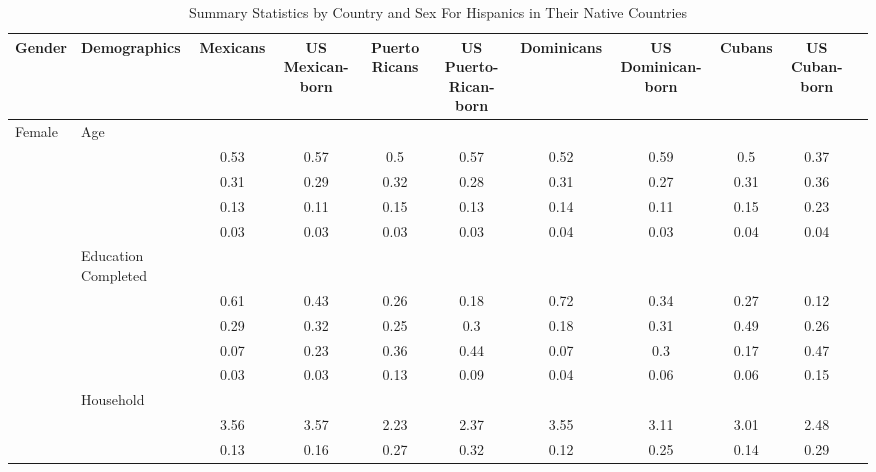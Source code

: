 \begin{table}[ht]
\centering
\caption{Summary Statistics by Country and Sex For Hispanics in Their Native Countries} 
\begingroup\small
\begin{tabular}{l>{\raggedright\arraybackslash}p{3.2cm}|ccccccccc}
  \hline
Gender & Demographics & Mexicans & US Mexican-born & Puerto Ricans & US Puerto-Rican-born & Dominicans & US Dominican-born & Cubans & US Cuban-born \\ 
  \hline
Female & Age &  &  &  &  &  &  &  &  \\ 
   & \multicolumn{1}{>{\raggedleft\arraybackslash}p{1.5cm}|}{\makebox[1.5cm][r]{60 - 69 }} & 0.53 & 0.57 & 0.5 & 0.57 & 0.52 & 0.59 & 0.5 & 0.37 \\ 
   & \multicolumn{1}{>{\raggedleft\arraybackslash}p{1.5cm}|}{\makebox[1.5cm][r]{70 - 79 }} & 0.31 & 0.29 & 0.32 & 0.28 & 0.31 & 0.27 & 0.31 & 0.36 \\ 
   & \multicolumn{1}{>{\raggedleft\arraybackslash}p{1.5cm}|}{\makebox[1.5cm][r]{80 - 89 }} & 0.13 & 0.11 & 0.15 & 0.13 & 0.14 & 0.11 & 0.15 & 0.23 \\ 
   & \multicolumn{1}{>{\raggedleft\arraybackslash}p{1.5cm}|}{\makebox[1.5cm][r]{90 plus }} & 0.03 & 0.03 & 0.03 & 0.03 & 0.04 & 0.03 & 0.04 & 0.04 \\ 
   & Education Completed &  &  &  &  &  &  &  &  \\ 
   & \multicolumn{1}{>{\raggedleft\arraybackslash}p{3.2cm}|}{\makebox[3.2cm][r]{Less than Primary }} & 0.61 & 0.43 & 0.26 & 0.18 & 0.72 & 0.34 & 0.27 & 0.12 \\ 
   & \multicolumn{1}{>{\raggedleft\arraybackslash}p{1.7cm}|}{\makebox[1.7cm][r]{Primary }} & 0.29 & 0.32 & 0.25 & 0.3 & 0.18 & 0.31 & 0.49 & 0.26 \\ 
   & \multicolumn{1}{>{\raggedleft\arraybackslash}p{2cm}|}{\makebox[2cm][r]{Secondary }} & 0.07 & 0.23 & 0.36 & 0.44 & 0.07 & 0.3 & 0.17 & 0.47 \\ 
   & \multicolumn{1}{>{\raggedleft\arraybackslash}p{2cm}|}{\makebox[2cm][r]{University }} & 0.03 & 0.03 & 0.13 & 0.09 & 0.04 & 0.06 & 0.06 & 0.15 \\ 
   & Household &  &  &  &  &  &  &  &  \\ 
   & \multicolumn{1}{>{\raggedleft\arraybackslash}p{2.7cm}|}{\makebox[2.7cm][r]{Household Size }} & 3.56 & 3.57 & 2.23 & 2.37 & 3.55 & 3.11 & 3.01 & 2.48 \\ 
   & \multicolumn{1}{>{\raggedleft\arraybackslash}p{2.2cm}|}{\makebox[2.2cm][r]{Lives Alone }} & 0.13 & 0.16 & 0.27 & 0.32 & 0.12 & 0.25 & 0.14 & 0.29 \\ 

\end{tabular}
\end{table}
